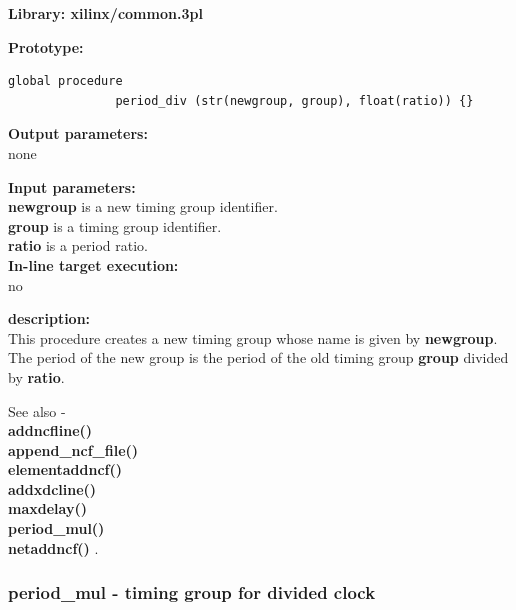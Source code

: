            {\bf Library: xilinx/common.3pl}

            {\bf Prototype:} \\
            \vsp
            \begin{lstlisting}[gobble=12, language=threepl]
               global procedure
               period_div (str(newgroup, group), float(ratio)) {}
            \end{lstlisting}

            {\bf Output parameters:} \\
            none

            {\bf Input parameters:} \\            
            {\bf newgroup} is a new timing group identifier. \\
            {\bf group} is a timing group identifier. \\
            {\bf ratio} is a period ratio. \\
        
            {\bf In-line target execution:} \\
            no

            {\bf description:} \\
            This procedure creates a new timing group whose name is
            given by {\bf newgroup}. The period of the new group is
            the period of the old timing group {\bf group} divided
            by {\bf ratio}.
            
            See also - \\
            {\bf addncfline()} \\
            {\bf append\_ncf\_file()} \\
            {\bf elementaddncf()} \\
            {\bf addxdcline()} \\
            {\bf maxdelay()} \\
            {\bf period\_mul()} \\
            {\bf netaddncf()} .




        \subsubsection{period\_mul - timing group for divided clock}\label{sec:lpperiodmul}
            
